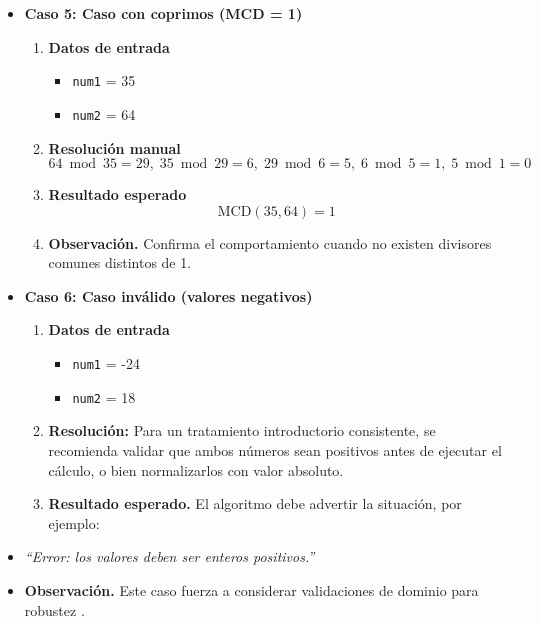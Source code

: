 \documentclass[12pt,twoside]{book}
\begin{document}
\begin{itemize}
							\item \textbf{Caso 5: Caso con coprimos (MCD = 1)}
							\begin{enumerate}
								\item \textbf{Datos de entrada}
								\begin{itemize}
									\item \texttt{num1} = 35
									\item \texttt{num2} = 64
								\end{itemize}
								\item \textbf{Resolución manual}
								\[
								64 \bmod 35 = 29,\;
								35 \bmod 29 = 6,\;
								29 \bmod 6 = 5,\;
								6 \bmod 5 = 1,\;
								5 \bmod 1 = 0
								\]
								\item \textbf{Resultado esperado}
								\[
								\text{MCD}(35,64) = 1
								\]
								\item \textbf{Observación.} Confirma el comportamiento cuando no existen divisores comunes distintos de 1.
							\end{enumerate}
							
							
							\item \textbf{Caso 6: Caso inválido (valores negativos)}
							\begin{enumerate}
								\item \textbf{Datos de entrada}
								\begin{itemize}
									\item \texttt{num1} = -24
									\item \texttt{num2} = 18
								\end{itemize}
								\item \textbf{Resolución:} Para un tratamiento introductorio consistente, se recomienda validar que ambos números sean positivos antes de ejecutar el cálculo, o bien normalizarlos con valor absoluto.
								\item \textbf{Resultado esperado.} El algoritmo debe advertir la situación, por ejemplo:
							\end{enumerate}
							\item \textit{``Error: los valores deben ser enteros positivos.''}
							\item \textbf{Observación.} Este caso fuerza a considerar validaciones de dominio para robustez \cite{Pressman2019Software,Sommerville2015Software}.
						\end{itemize}
						
\end{document}

